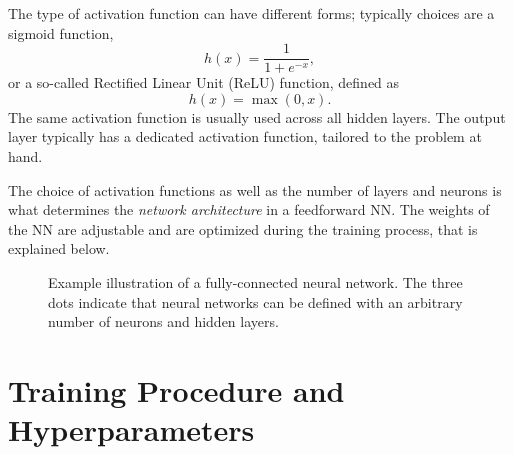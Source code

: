The type of activation function can have different forms; typically choices are a sigmoid function,
\begin{equation}
    h(x)={\frac {1}{1+e^{-x}}},
\end{equation}
or a so-called Rectified Linear Unit (ReLU) function, defined as
\begin{equation}
    {h(x)=\max(0,x)}.    
\end{equation}
The same activation function is usually used across all hidden layers.
The output layer typically has a dedicated activation function, tailored to the problem at hand.

The choice of activation functions as well as the number of layers and neurons is what determines the \emph{network architecture} in a feedforward NN. The weights of the NN are adjustable and are optimized during the training process, that is explained below.




\begin{figure}[t]
    \caption{Example illustration of a fully-connected neural network. The three dots indicate that neural networks can be defined with an arbitrary number of neurons and hidden layers.}
    \label{fig:neural-net}
\end{figure}




\section{Training Procedure and Hyperparameters}

